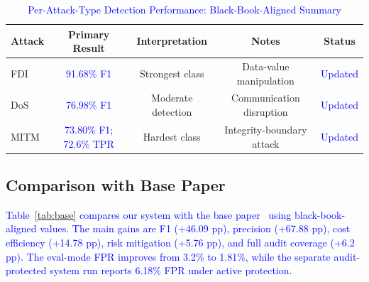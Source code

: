 \documentclass[conference,a4paper]{IEEEtran}
\begin{document}
\begin{table}[htbp]
\caption{\textcolor{blue}{Per-Attack-Type Detection Performance: Black-Book-Aligned Summary}}
\begin{center}
\begin{tabular}{|l|c|c|c|c|}
\hline
\textbf{Attack} & \textbf{Primary Result} & \textbf{Interpretation} & \textbf{Notes} & \textbf{Status} \\
\hline
FDI & \textcolor{blue}{91.68\% F1} & Strongest class & Data-value manipulation & \textcolor{blue}{Updated} \\
\hline
DoS & \textcolor{blue}{76.98\% F1} & Moderate detection & Communication disruption & \textcolor{blue}{Updated} \\
\hline
MITM & \textcolor{blue}{73.80\% F1; 72.6\% TPR} & Hardest class & Integrity-boundary attack & \textcolor{blue}{Updated} \\
\hline
\end{tabular}
\label{tab:attacktype}
\end{center}
\end{table}

\subsection{Comparison with Base Paper}

\textcolor{blue}{Table~\ref{tab:base} compares our system with the base paper~\cite{b17} using black-book-aligned values. The main gains are F1 (+46.09 pp), precision (+67.88 pp), cost efficiency (+14.78 pp), risk mitigation (+5.76 pp), and full audit coverage (+6.2 pp). The eval-mode FPR improves from 3.2\% to 1.81\%, while the separate audit-protected system run reports 6.18\% FPR under active protection.}
\end{document}
